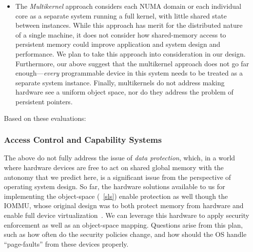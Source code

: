 {\begin{itemize}
        \item The \emph{Multikernel} approach considers each NUMA domain or each individual core as a
              separate system running a full kernel, with little shared state between instances. While
              this approach has merit for the distributed nature of a single machine, it does not consider
              how shared-memory access to persistent memory could improve application and system design
              and performance. We plan to take this approach into consideration in our design.
              Furthermore, our above \observations suggest that the multikernel approach does not go far
              enough---\emph{every} programmable device in this system needs to be treated as a separate
              system instance. Finally, multikernels do not address making hardware see a uniform
              object space, nor do they address the problem of persistent pointers.
    \end{itemize}

    Based on these evaluations:



    \subsubsection{Access Control and Capability Systems}
    The above \observations do not fully address the issue of \emph{data protection}, which, in a world
    where hardware devices are free to act on shared global memory with the autonomy that we predict
    here, is a significant issue from the perspective of operating system design. So far, the hardware
    solutions available to us for implementing the object-space (\observation~\ref{sls}) enable
    protection as well though the IOMMU, whose original design was to both protect memory from hardware
    and enable full device virtualization~\cite{markuze2016true}. We can leverage this hardware to apply
    security enforcement as well as an object-space mapping. Questions arise from this plan, such as how
    often do the security policies change, and how should the OS handle ``page-faults'' from these devices properly.

}
